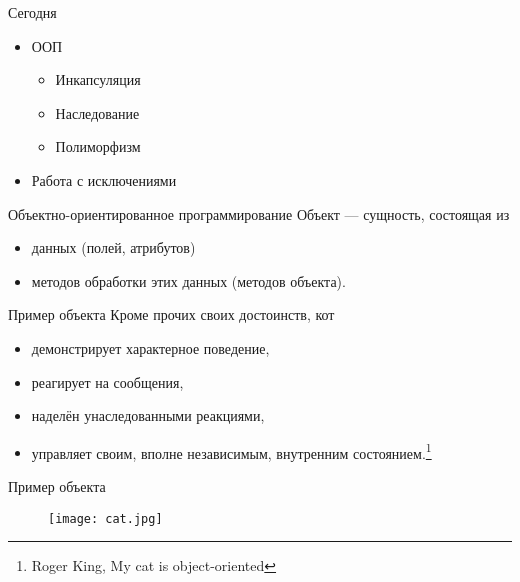 \documentclass[hyperref={pdftex,unicode}]{beamer}
\begin{document}
\begin{frame}
  \maketitle
\end{frame}

\begin{frame}{Сегодня}
  \begin{itemize}
    \item ООП
      \begin{itemize}
      \item Инкапсуляция
      \item Наследование
      \item Полиморфизм
      \end{itemize}
    \item Работа с исключениями
  \end{itemize}
\end{frame}

\begin{frame}{Объектно-ориентированное программирование}
  Объект --- сущность, состоящая из \\
  \begin{itemize}
  \item данных (полей, атрибутов)
  \item методов обработки этих данных (методов объекта).
  \end{itemize}
\end{frame}

\begin{frame}{Пример объекта}
  Кроме прочих своих достоинств, кот
  \begin{itemize}
    \item демонстрирует характерное поведение,
    \item реагирует на сообщения,
    \item наделён унаследованными реакциями,
    \item управляет своим, вполне независимым, внутренним состоянием.\footnote[frame]{
   Roger King, My cat is object-oriented}
 \end{itemize}
\end{frame}

\begin{frame}{Пример объекта}
 \begin{figure}[h!]
   \texttt{[image: cat.jpg]}
 \end{figure}
\end{frame}
\end{document}
